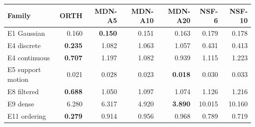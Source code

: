 \begin{tabular}{@{}lrrrrrr@{}}
\toprule
Family & ORTH & MDN-A5 & MDN-A10 & MDN-A20 & NSF-6 & NSF-10 \\
\midrule
E1 Gaussian & 0.160 & \textbf{0.150} & 0.151 & 0.163 & 0.179 & 0.178 \\
E4 discrete & \textbf{0.235} & 1.082 & 1.063 & 1.057 & 0.431 & 0.413 \\
E4 continuous & \textbf{0.707} & 1.197 & 1.082 & 0.939 & 1.115 & 1.223 \\
E5 support motion & 0.021 & 0.028 & 0.023 & \textbf{0.018} & 0.030 & 0.033 \\
E8 filtered & \textbf{0.688} & 1.050 & 1.097 & 1.074 & 1.126 & 1.216 \\
E9 dense & 6.280 & 6.317 & 4.920 & \textbf{3.890} & 10.015 & 10.160 \\
E11 ordering & \textbf{0.279} & 0.914 & 0.956 & 0.968 & 0.789 & 0.719 \\
\bottomrule
\end{tabular}
